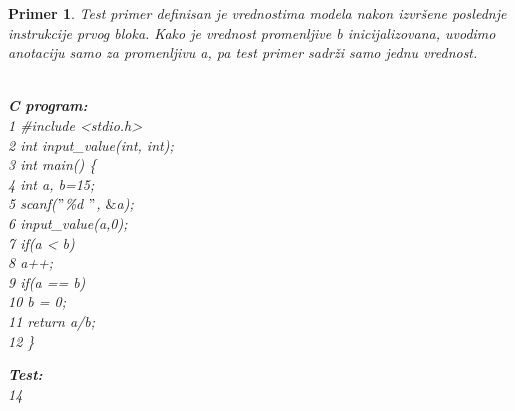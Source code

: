 \documentclass[12pt,oneside]{memoir}
\newcommand\tab[1][0.5cm]{\hspace*{#1}}
\newtheorem{primer}{Primer}
\begin{document}
\begin{primer} Test primer definisan je vrednostima modela nakon izvršene poslednje instrukcije prvog bloka. Kako je vrednost promenljive b inicijalizovana, uvodimo anotaciju samo za promenljivu a, pa test primer sadrži samo jednu vrednost. \label{example22}  
\\ \\
\hspace{-0.6cm}
\begin{minipage}[b]{0.5\textwidth}
\textbf{C program:}\\
1 \hspace{0.1cm} \#include <stdio.h> \\
2 \hspace{0.1cm} int input\_value(int, int);\\ 
3 \hspace{0.1cm} int main() \{ \\
4 \hspace{0.1cm} \tab int a, b=15;\\
5 \hspace{0.1cm} \tab scanf($"$\%d $"$, $\&$a);\\
6 \hspace{0.1cm} \tab input\_value(a,0);\\
7 \hspace{0.1cm} \tab if(a < b)\\
8 \hspace{0.1cm} \tab \tab a++;\\
9 \hspace{0.1cm} \tab if(a == b)\\
10 \hspace{0.1cm} \tab \tab b = 0;\\
11 \hspace{0.1cm} \tab return a/b;\\
12 \hspace{0.1cm} \}

\end{minipage}
\hspace{0.3cm}
\begin{minipage}[t]{0.4\textwidth}
\vspace{-7.88cm}
\textbf{Test:}\\
14
\end{minipage}
\end{primer}
\end{document}
